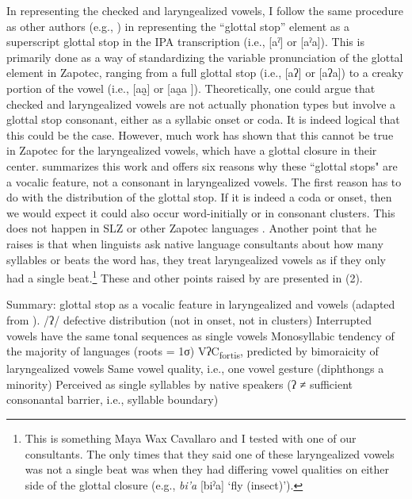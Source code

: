 \documentclass[12pt, letterpaper]{article}
\newcommand{\sub}[1]{\textsubscript{#1}}
\begin{document}
In representing the checked and laryngealized vowels, I follow the same procedure as other authors (e.g., \citet{avelinoAcousticElectroglottographicAnalyses2010, uchiharaToneRegistrogenesisQuiavini2016}) in representing the ``glottal stop'' element as a superscript glottal stop in the IPA transcription (i.e., [aˀ] or [aˀa]). This is primarily done as a way of standardizing the variable pronunciation of the glottal element in Zapotec, ranging from a full glottal stop (i.e., [aʔ] or [aʔa]) to a creaky portion of the vowel (i.e., [aa̰] or [aa̰a ]).  
Theoretically, one could argue that checked and laryngealized vowels are not actually phonation types but involve a glottal stop consonant, either as a syllabic onset or coda. It is indeed logical that this could be the case. However, much work has shown that this cannot be true in Zapotec for the laryngealized vowels, which have a glottal closure in their center. \citet{chavez-peonInteractionMetricalStructure2010} summarizes this work and offers six reasons why these ``glottal stops" are a vocalic feature, not a consonant in laryngealized vowels. The first reason has to do with the distribution of the glottal stop. If it is indeed a coda or onset, then we would expect it could also occur word-initially or in consonant clusters. This does not happen in SLZ or other Zapotec languages \citep{jaegerInitialConsonantClusters1982}. Another point that he raises is that when linguists ask native language consultants about how many syllables or beats the word has, they treat laryngealized vowels as if they only had a single beat.\footnote{This is something Maya Wax Cavallaro and I tested with one of our consultants. The only times that they said one of these laryngealized vowels was not a single beat was when they had differing vowel qualities on either side of the glottal closure (e.g., \textit{bi'a} [biˀa] `fly (insect)').} These and other points raised by \citeauthor{chavez-peonInteractionMetricalStructure2010} are presented in (2). 

\ea  Summary: glottal stop as a vocalic feature in laryngealized and vowels (adapted from \cite{chavez-peonInteractionMetricalStructure2010}).
    \ea /ʔ/ defective distribution (not in onset, not in clusters)
    \ex Interrupted vowels have the same tonal sequences as single vowels
    \ex Monosyllabic tendency of the majority of languages (roots = 1σ)
    \ex *VʔC\sub{fortis}, predicted by bimoraicity of laryngealized vowels
    \ex Same vowel quality, i.e., one vowel gesture (diphthongs a minority)
    \ex Perceived as single syllables by native speakers (ʔ ≠ sufficient consonantal barrier, i.e., syllable boundary)
    \z 
\z 
\end{document}
